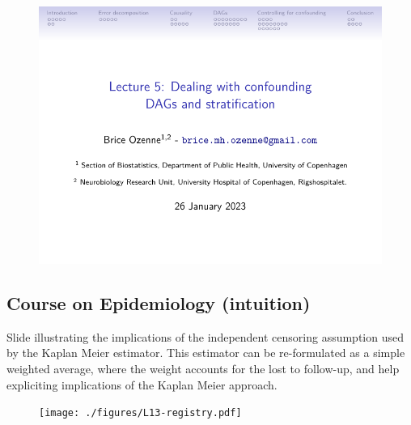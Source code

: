 \documentclass[12pt]{article}
\begin{document}
\begin{figure}[!h]
\centering
\includegraphics[trim={0 0 0 0}, page = 6, width=1\textwidth]{./figures/L5-confounding.pdf}
\label{fig:lmm-slide-wiw}
\end{figure}

\clearpage

\subsection{Course on Epidemiology (intuition)}
\label{appendix-intuition}
Slide illustrating the implications of the independent censoring
assumption used by the Kaplan Meier estimator. This estimator can be
re-formulated as a simple weighted average, where the weight accounts
for the lost to follow-up, and help expliciting implications of the
Kaplan Meier approach.

\begin{figure}[!h]
\centering
\texttt{[image: ./figures/L13-registry.pdf]}
\label{fig:lmm-slide-wiw}
\end{figure}

\clearpage
\end{document}
